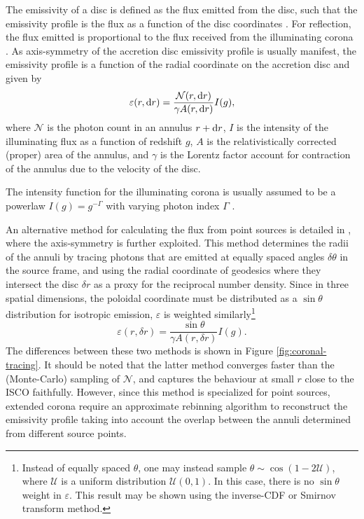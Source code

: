 The emissivity of a disc is defined as the flux emitted from the disc, such that the emissivity profile is the flux as a function of the disc coordinates \citep{wilkins_understanding_2012}. For reflection, the flux emitted is proportional to the flux received from the illuminating corona \citep{laor_line_1991}. As axis-symmetry of the accretion disc emissivity profile is usually manifest, the emissivity profile is a function of the radial coordinate on the accretion disc and given by
\begin{equation}
    \varepsilon (r, \text{d} r) = \frac{\mathcal{N}(r, \text{d} r)}{\gamma A(r, \text{d} r)} I(g),
\end{equation}
where $\mathcal{N}$ is the photon count in an annulus $r + \text{d} r$, $I$ is the intensity of the illuminating flux as a function of redshift $g$, $A$ is the relativistically corrected (proper) area of the annulus, and $\gamma$ is the Lorentz factor account for contraction of the annulus due to the velocity of the disc.

The intensity function for the illuminating corona is usually assumed to be a powerlaw $I(g) = g^{-\Gamma}$ with varying photon index $\Gamma$ \citep{gonzalez_probing_2017}.

An alternative method for calculating the flux from point sources is detailed in \cite{dauser_irradiation_2013}, where the axis-symmetry is further exploited. This method determines the radii of the annuli by tracing photons that are emitted at equally spaced angles $\delta \theta$ in the source frame, and using the radial coordinate of geodesics where they intersect the disc $\delta r$ as a proxy for the reciprocal number density. Since in three spatial dimensions, the poloidal coordinate must be distributed as a $\sin \theta$ distribution for isotropic emission, $\varepsilon$ is weighted similarly\footnote{Instead of equally spaced $\theta$, one may instead sample $\theta \sim \cos (1 - 2 \mathcal{U})$, where $\mathcal{U}$ is a uniform distribution $\mathcal{U}(0,1)$. In this case, there is no $\sin \theta$ weight in $\varepsilon$. This result may be shown using the inverse-CDF or Smirnov transform method.}
\begin{equation}
    \varepsilon(r, \delta r) = \frac{\sin \theta}{\gamma A(r, \delta r)} I(g).
\end{equation}
The differences between these two methods is shown in Figure \ref{fig:coronal-tracing}. It should be noted that the latter method converges faster than the (Monte-Carlo) sampling of $\mathcal{N}$, and captures the behaviour at small $r$ close to the ISCO faithfully. However, since this method is specialized for point sources, extended corona require an approximate rebinning algorithm to reconstruct the emissivity profile taking into account the overlap between the annuli determined from different source points.

